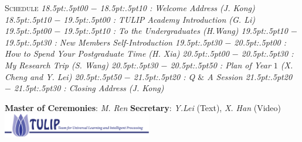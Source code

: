 \documentclass{article}
\begin{document}
{\scshape  Schedule}
\textit{%
\footnotesize{
  18\kern.5pt:\kern.5pt00 $-$ 18\kern.5pt:\kern.5pt10 : Welcome Address (J. Kong)
  18\kern.5pt:\kern.5pt10 $-$ 19\kern.5pt:\kern.5pt00 : TULIP Academy Introduction (G. Li)
  19\kern.5pt:\kern.5pt00 $-$ 19\kern.5pt:\kern.5pt10 : To the Undergraduates (H.Wang)
  19\kern.5pt:\kern.5pt10 $-$ 19\kern.5pt:\kern.5pt30 : New Members Self-Introduction
  19\kern.5pt:\kern.5pt30 $-$ 20\kern.5pt:\kern.5pt00 : How to Spend Your Postgraduate Time (H. Xia)
  20\kern.5pt:\kern.5pt00 $-$ 20\kern.5pt:\kern.5pt30 : My Research Trip (S. Wang)
  20\kern.5pt:\kern.5pt30 $-$ 20\kern.5pt:\kern.5pt50 : Plan of Year $1$ (X. Cheng and Y. Lei)
  20\kern.5pt:\kern.5pt50 $-$ 21\kern.5pt:\kern.5pt20 : Q $\&$ A Session
  21\kern.5pt:\kern.5pt20 $-$ 21\kern.5pt:\kern.5pt30 : Closing Address (J. Kong)}
}

\smallbreak
{\scshape }
%
\smallbreak
\footnotesize{
\textbf{Master of Ceremonies}: \textit{M. Ren}
\textbf{Secretary}: \textit{Y.Lei} (Text), \textit{X. Han} (Video)
}
\smallbreak
\includegraphics[width=6.5cm]{logos/tulip-wordmark.eps}
\end{document}
